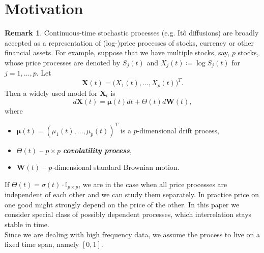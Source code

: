 \documentclass[a4paper,11pt]{book}
\theoremstyle{plain}
\theoremstyle{definition}
\newtheorem{rmrk}[thm]{Remark}
\newcommand{\define}[1]{\textit{\textbf{#1}}}
\begin{document}
	\section{Motivation}
	\begin{rmrk}
		Continuous-time stochastic processes (e.g. Itô diffusions) are broadly accepted as a representation of (log-)price processes of stocks, currency or other financial assets. For example, suppose that we have multiple stocks, say, $p$ stocks, whose price processes are denoted by $S_j(t)$ and $X_j(t) \coloneqq \log S_j(t)$ for $j = 1, \dots, p$. Let
		\[ \mathbf{X}(t) = \big(X_1(t), \dots, X_p(t)\big)^T. \]
		Then a widely used model for $\mathbf{X}_t$ is
		\begin{equation} \label{X diffeq}
		d\mathbf{X}(t) = \boldsymbol{\mu}(t) dt + \Theta(t) d\mathbf{W}(t),
		\end{equation}
		where 
		\begin{itemize}
			\item $\boldsymbol{\mu}(t) = (\mu_1(t), \dots, \mu_p(t))^T$ is a $p$-dimensional drift process,
			\item $\Theta(t)$ -- $p \times p$ \define{covolatility process},
			\item $\mathbf{W}(t)$ -- $p$-dimensional standard Brownian motion.
		\end{itemize}
		If $\Theta(t) = \sigma(t) \cdot \mathbb{I}_{p \times p} $, we are in the case when all price processes are independent of each other and we can study them separately. In practice price on one good might strongly depend on the price of the other. In this paper we consider special class of possibly dependent processes, which interrelation stays stable in time. \\
		Since we are dealing with high frequency data, we assume the process to live on a fixed time span, namely $[0, 1]$. \\
	\end{rmrk}
\end{document}
